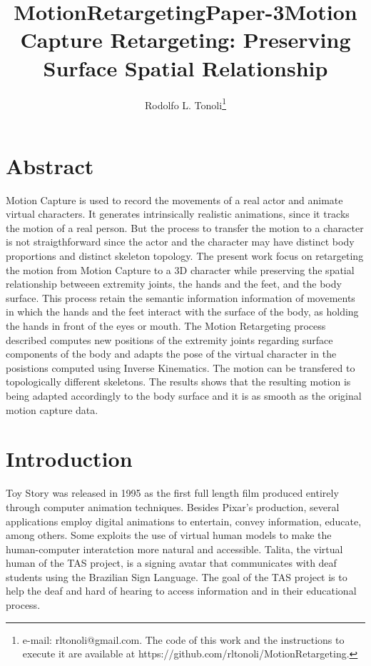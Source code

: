 \documentclass{vgtc}
\title{MotionRetargetingPaper-3}
\begin{document}
    
    
    
\author{Rodolfo L. Tonoli\thanks{e-mail: rltonoli@gmail.com. The code of this work and the instructions to execute it are available at https://github.com/rltonoli/MotionRetargeting.}}
\title{Motion Capture Retargeting: Preserving Surface Spatial Relationship}
\maketitle

    
    

    

    \section{Abstract}\label{abstract}

Motion Capture is used to record the movements of a real actor and
animate virtual characters. It generates intrinsically realistic
animations, since it tracks the motion of a real person. But the process
to transfer the motion to a character is not straigthforward since the
actor and the character may have distinct body proportions and distinct
skeleton topology. The present work focus on retargeting the motion from
Motion Capture to a 3D character while preserving the spatial
relationship betweeen extremity joints, the hands and the feet, and the
body surface. This process retain the semantic information information
of movements in which the hands and the feet interact with the surface
of the body, as holding the hands in front of the eyes or mouth. The
Motion Retargeting process described computes new positions of the
extremity joints regarding surface components of the body and adapts the
pose of the virtual character in the posistions computed using Inverse
Kinematics. The motion can be transfered to topologically different
skeletons. The results shows that the resulting motion is being adapted
accordingly to the body surface and it is as smooth as the original
motion capture data.

    \section{Introduction}\label{introduction}

Toy Story was released in 1995 as the first full length film produced
entirely through computer animation techniques\cite{henne}. Besides
Pixar's production, several applications employ digital animations to
entertain, convey information, educate, among others. Some exploits the
use of virtual human models to make the human-computer interatction more
natural and accessible. Talita, the virtual human of the TAS
project\cite{demartino}, is a signing avatar that communicates with deaf
students using the Brazilian Sign Language. The goal of the TAS project
is to help the deaf and hard of hearing to access information and in
their educational process.
\end{document}
